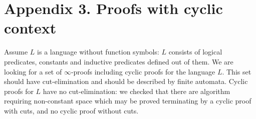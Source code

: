 \documentclass[a4paper,12pt]{article}
\newcommand{\Nat}               { {\tt N}  }
\newcommand{\FV}              { {\tt FV} }
\begin{document}



\section{Appendix 3. Proofs with cyclic context}
Assume $L$ is a language without function symbols: $L$ consists of logical predicates, constants and inductive predicates defined out of them. We are looking for a set of $\infty$-proofs including cyclic proofs for the language $L$. This set should have cut-elimination and should be described by finite automata. Cyclic proofs for $L$ have no cut-elimination: we checked that there are algorithm requiring non-constant space  which may be proved terminating by a cyclic proof with cuts, and no cyclic proof without cuts.
\end{document}
